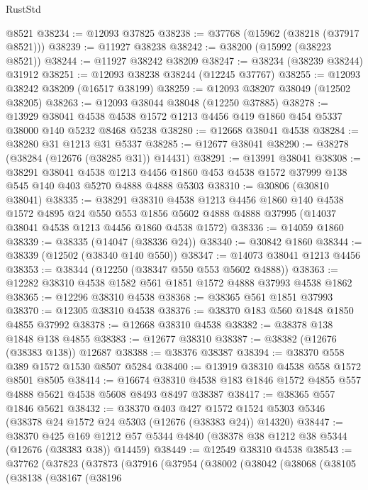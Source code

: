 \begin{lexlean}{RustStd}
\begin{coremodule}
    @8521
@38234 := @12093 @37825
@38238 := @37768 (@15962 (@38218 (@37917 @8521)))
@38239 := @11927 @38238
@38242 := @38200 (@15992 (@38223 @8521))
@38244 := @11927 @38242 @38209
@38247 := @38234 (@38239 @38244) @31912
@38251 := @12093 @38238 @38244 (@12245 @37767)
@38255 := @12093 @38242 @38209 (@16517 @38199)
@38259 := @12093 @38207 @38049 (@12502 @38205)
@38263 := @12093 @38044 @38048 (@12250 @37885)
@38278 := @13929
    @38041
    @4538
    @4538
    @1572
    @1213
    @4456
    @419
    @1860
    @454
    @5337
    @38000
    @140
    @5232
    @8468
    @5238
@38280 := @12668 @38041 @4538
@38284 := @38280 @31 @1213 @31 @5337
@38285 := @12677 @38041
@38290 := @38278 (@38284 (@12676 (@38285 @31)) @14431)
@38291 := @13991 @38041
@38308 := @38291
    @38041
    @4538
    @1213
    @4456
    @1860
    @453
    @4538
    @1572
    @37999
    @138
    @545
    @140
    @403
    @5270
    @4888
    @4888
    @5303
@38310 := @30806 (@30810 @38041)
@38335 := @38291
    @38310
    @4538
    @1213
    @4456
    @1860
    @140
    @4538
    @1572
    @4895
    @24
    @550
    @553
    @1856
    @5602
    @4888
    @4888
    @37995
    (@14037 @38041 @4538 @1213 @4456 @1860 @4538 @1572)
@38336 := @14059 @1860
@38339 := @38335 (@14047 (@38336 @24))
@38340 := @30842 @1860
@38344 := @38339 (@12502 (@38340 @140 @550))
@38347 := @14073 @38041 @1213 @4456
@38353 := @38344 (@12250 (@38347 @550 @553 @5602 @4888))
@38363 := @12282 @38310 @4538 @1582 @561 @1851 @1572 @4888 @37993 @4538 @1862
@38365 := @12296 @38310 @4538
@38368 := @38365 @561 @1851 @37993
@38370 := @12305 @38310 @4538
@38376 := @38370 @183 @560 @1848 @1850 @4855 @37992
@38378 := @12668 @38310 @4538
@38382 := @38378 @138 @1848 @138 @4855
@38383 := @12677 @38310
@38387 := @38382 (@12676 (@38383 @138)) @12687
@38388 := @38376 @38387
@38394 := @38370 @558 @389 @1572 @1530 @8507 @5284
@38400 := @13919 @38310 @4538 @558 @1572 @8501 @8505
@38414 := @16674 @38310 @4538 @183 @1846 @1572 @4855 @557 @4888 @5621 @4538 @5608 @8493 @8497 @38387
@38417 := @38365 @557 @1846 @5621
@38432 := @38370
    @403
    @427
    @1572
    @1524
    @5303
    @5346
    (@38378 @24 @1572 @24 @5303 (@12676 (@38383 @24)) @14320)
@38447 := @38370
    @425
    @169
    @1212
    @57
    @5344
    @4840
    (@38378 @38 @1212 @38 @5344 (@12676 (@38383 @38)) @14459)
@38449 := @12549 @38310 @4538
@38543 := @37762
    (@37823
      (@37873
        (@37916
          (@37954
            (@38002
              (@38042
                (@38068
                  (@38105
                    (@38138
                      (@38167
                        (@38196

\end{coremodule}
\end{lexlean}
